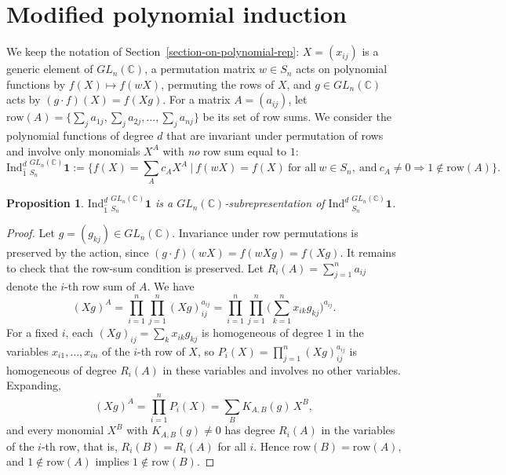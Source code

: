 \documentclass[reqno]{amsart}
\theoremstyle{plain}
\newtheorem{proposition}[theorem]{Proposition}
\theoremstyle{definition}
\theoremstyle{remark}
\theoremstyle{plain}
\newcommand{\C}{\mathbb{C}}
\begin{document}
\section{Modified polynomial induction}\label{modified-poly-rep}
We keep the notation of Section~\ref{section-on-polynomial-rep}: $X=(x_{ij})$
is a generic element of $GL_n(\C)$, a permutation matrix $w\in S_n$ acts on
polynomial functions by $f(X)\mapsto f(wX)$, permuting the rows of $X$, and
$g\in GL_n(\C)$ acts by $(g\cdot f)(X)=f(Xg)$. For a matrix $A=(a_{ij})$, let
$\mathrm{row}(A)=\big\{\sum_{j}a_{1j},\sum_{j}a_{2j},\dots, \sum_{j}a_{nj}\big\}$
be its set of row sums. We consider the polynomial functions of degree $d$
that are invariant under permutation of rows and involve only monomials $X^A$
with \emph{no} row sum equal to $1$:
\begin{equation}\label{def-modified-poly-ind}
\mathrm{Ind}_{\hat{1}}^d\ _{S_n}^{GL_n(\C)}\mathbf{1}:=\Big\{f(X)=\sum_Ac_AX^A\ \Big|\ f(wX)=f(X)\ \text{for all}\ w\in S_n,\ \text{and}\ c_A\neq0\Rightarrow 1\notin \mathrm{row}(A)\Big\}.
\end{equation}

\begin{proposition}
$\mathrm{Ind}_{\hat{1}}^d\ _{S_n}^{GL_n(\C)}\mathbf{1}$ is a
$GL_n(\C)$-subrepresentation of $\mathrm{Ind}^d\ _{S_n}^{GL_n(\C)}\mathbf{1}$.
\end{proposition}
\begin{proof}
Let $g=(g_{kj})\in GL_n(\C)$. Invariance under row permutations is preserved
by the action, since
$(g\cdot f)(wX)=f(wXg)=f(Xg)$. It remains to check that the row-sum condition
is preserved. Let $R_i(A) = \sum_{j=1}^n a_{ij}$ denote the $i$-th row sum of
$A$. We have
\begin{equation*}
    (Xg)^A = \prod_{i=1}^n \prod_{j=1}^n (Xg)_{ij}^{a_{ij}} = \prod_{i=1}^n \prod_{j=1}^n \Big( \sum_{k=1}^n x_{ik} g_{kj} \Big)^{a_{ij}}.
\end{equation*}
For a fixed $i$, each $(Xg)_{ij} = \sum_{k} x_{ik} g_{kj}$ is homogeneous of
degree $1$ in the variables $x_{i1}, \dots, x_{in}$ of the $i$-th row of $X$,
so $P_i(X) = \prod_{j=1}^n (Xg)_{ij}^{a_{ij}}$ is homogeneous of degree
$R_i(A)$ in these variables and involves no other variables. Expanding,
\begin{equation*}
    (Xg)^A=\prod_{i=1}^n P_i(X) = \sum_{B} K_{A,B}(g)\, X^B,
\end{equation*}
and every monomial $X^B$ with $K_{A,B}(g)\neq0$ has degree $R_i(A)$ in the
variables of the $i$-th row, that is, $R_i(B)=R_i(A)$ for all $i$. Hence
$\mathrm{row}(B)=\mathrm{row}(A)$, and $1\notin \mathrm{row}(A)$ implies
$1\notin \mathrm{row}(B)$.
\end{proof}
\end{document}
